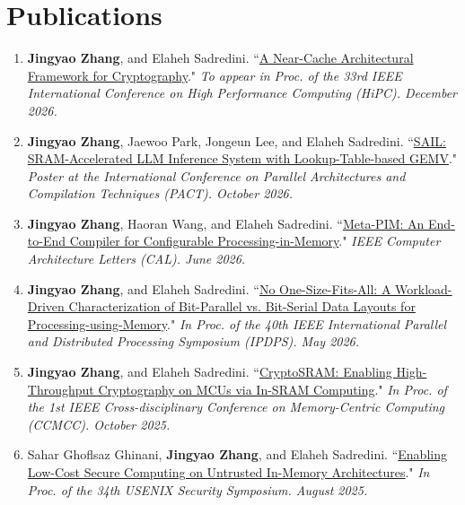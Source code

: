 \documentclass[letterpaper,11pt]{article}
\newcommand{\resumeSubHeadingListEnd}{\end{itemize}}
\begin{document}


\section{Publications}
  \vspace{2pt}
   \begin{enumerate}[leftmargin=*, labelindent=12pt, label=\arabic*., topsep=0pt, partopsep=0pt, parsep=0pt, itemsep=3pt]
    \small
        \item \textbf{Jingyao Zhang}, and Elaheh Sadredini. ``\href{https://arxiv.org/abs/2509.23179}{A Near-Cache Architectural Framework for Cryptography}." \textit{To appear in Proc. of the 33rd IEEE International Conference on High Performance Computing (HiPC). December 2026.}

        \item \textbf{Jingyao Zhang}, Jaewoo Park, Jongeun Lee, and Elaheh Sadredini. ``\href{https://arxiv.org/abs/2509.25853}{SAIL: SRAM-Accelerated LLM Inference System with Lookup-Table-based GEMV}." \textit{Poster at the International Conference on Parallel Architectures and Compilation Techniques (PACT). October 2026.}

        \item \textbf{Jingyao Zhang}, Haoran Wang, and Elaheh Sadredini. ``\href{https://ieeexplore.ieee.org/document/11594411/}{Meta-PIM: An End-to-End Compiler for Configurable Processing-in-Memory}." \textit{IEEE Computer Architecture Letters (CAL). June 2026.}

        \item \textbf{Jingyao Zhang}, and Elaheh Sadredini. ``\href{https://arxiv.org/abs/2509.22980}{No One-Size-Fits-All: A Workload-Driven Characterization of Bit-Parallel vs. Bit-Serial Data Layouts for Processing-using-Memory}." \textit{In Proc. of the 40th IEEE International Parallel and Distributed Processing Symposium (IPDPS). May 2026.}

        \item \textbf{Jingyao Zhang}, and Elaheh Sadredini. ``\href{https://arxiv.org/abs/2509.22986}{CryptoSRAM: Enabling High-Throughput Cryptography on MCUs via In-SRAM Computing}." 
        \textit{In Proc. of the 1st IEEE Cross-disciplinary Conference on Memory-Centric Computing (CCMCC). October 2025.} 

        \item Sahar Ghoflsaz Ghinani, \textbf{Jingyao Zhang}, and Elaheh Sadredini. ``\href{https://arxiv.org/abs/2501.17292}{Enabling Low-Cost Secure Computing on Untrusted In-Memory Architectures}." \textit{In Proc. of the 34th USENIX Security Symposium. August 2025.} 
    

\end{enumerate}
\end{document}
